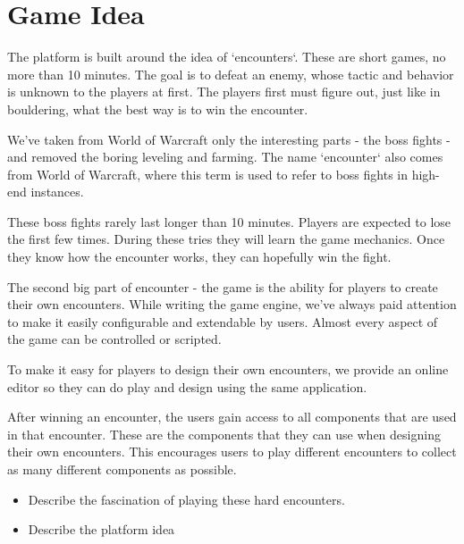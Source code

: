 \documentclass[10pt]{scrartcl}
\begin{document}
\section{Game Idea}

The platform is built around the idea of `encounters`. These are short games,
    no more than 10 minutes. The goal is to defeat an enemy, whose tactic and
    behavior is unknown to the players at first.
The players first must figure out, just like in bouldering, what the best way
    is to win the encounter.

We've taken from World of Warcraft only the interesting parts - the boss
    fights - and removed the boring leveling and farming.
The name `encounter` also comes from World of Warcraft, where this term is
    used to refer to boss fights in high-end instances.

These boss fights rarely last longer than 10 minutes. Players are expected
    to lose the first few times. During these tries they will learn the game
    mechanics. Once they know how the encounter works, they can hopefully win
    the fight.

The second big part of encounter - the game is the ability for players to
    create their own encounters.
While writing the game engine, we've always paid attention to make it easily
    configurable and extendable by users. Almost every aspect of the game
    can be controlled or scripted.

To make it easy for players to design their own encounters, we provide an
    online editor so they can do play and design using the same application.

After winning an encounter, the users gain access to all components that are
    used in that encounter. These are the components that they can use when
    designing their own encounters. This encourages users to play different
    encounters to collect as many different components as possible.



\begin{itemize}
  \item
    Describe the fascination of playing these hard encounters.

  \item
    Describe the platform idea
\end{itemize}

\end{document}
